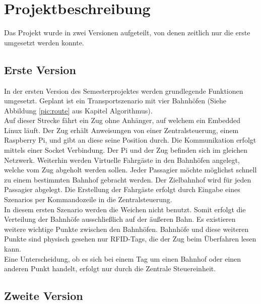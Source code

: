 \chapter{Projektbeschreibung}

Das Projekt wurde in zwei Versionen aufgeteilt, von denen zeitlich nur die erste umgesetzt werden konnte.

\section{Erste Version}

In der ersten Version des Semesterprojektes werden grundlegende Funktionen umgesetzt. Geplant ist ein Transportszenario mit vier Bahnhöfen (Siehe Abbildung \ref{pic:route} aus Kapitel Algorithmus).\\
Auf dieser Strecke fährt ein Zug ohne Anhänger, auf welchem ein Embedded Linux läuft. Der Zug erhält Anweisungen von einer Zentralsteuerung, einem Raspberry Pi, und gibt an diese seine Position durch. Die Kommunikation erfolgt mittels einer Socket Verbindung. Der Pi und der Zug befinden sich im gleichen Netzwerk. Weiterhin werden Virtuelle Fahrgäste in den Bahnhöfen angelegt, welche vom Zug abgeholt werden sollen. Jeder Passagier möchte möglichst schnell zu einem bestimmten Bahnhof gebracht werden. Der Zielbahnhof wird für jeden Passagier abgelegt. Die Erstellung der Fahrgäste erfolgt durch Eingabe eines Szenarios per Kommandozeile in die Zentralsteuerung.\\
In diesem ersten Szenario werden die Weichen nicht benutzt. Somit erfolgt die Verteilung der Bahnhöfe ausschließlich auf der äußeren Bahn. Es existieren weitere wichtige Punkte zwischen den Bahnhöfen. Bahnhöfe und diese weiteren Punkte sind physisch gesehen nur RFID-Tags, die der Zug beim Überfahren lesen kann.\\
Eine Unterscheidung, ob es sich bei einem Tag um einen Bahnhof oder einen anderen Punkt handelt, erfolgt nur durch die Zentrale Steuereinheit.

\section{Zweite Version}

